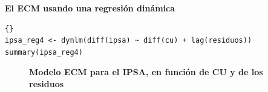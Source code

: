 %
\pagebreak
\textbf{El ECM usando una regresi\'on din\'amica}\\
%	
\begin{lstlisting}[title={‘Código R: Modelo de corrección de errores(ECM) con regresión dinámica},basicstyle=\ttfamily]{}
ipsa_reg4 <- dynlm(diff(ipsa) ~ diff(cu) + lag(residuos))
summary(ipsa_reg4)
\end{lstlisting}
%	
	\begin{figure}[H]
		\centering
		\textbf{Modelo ECM para el IPSA, en función de CU y de los residuos}\par\medskip
	\end{figure}
